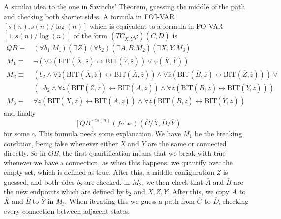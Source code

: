 A similar idea to the one in Savitchs' Theorem, guessing the middle of the path and checking both shorter sides.
A formula in FO$\exists$-VAR$[s(n), s(n)/\log(n)]$ which is equivalent to a formula in FO-VAR$[1, s(n)/\log(n)]$ of the form $\left( TC_{\overline{X}, \overline{Y}}\varphi \right)(\overline{C}, \overline{D})$ is
\[
\begin{aligned}
    QB \equiv~& (\forall b_{1}.M_{1})(\exists\overline{Z}) (\forall b_{2})(\exists \overline{A}, \overline{B}.M_{2})(\exists\overline{X}, \overline{Y}.M_{3}) \\
    M_{1} \equiv~& \neg(\forall \overline{z} (\text{BIT}(\overline{X}, \overline{z}) \leftrightarrow \text{BIT}(\overline{Y}, \overline{z})) \lor \varphi(\overline{X}, \overline{Y})) \\
    M_{2} \equiv~&(b_{2} \land \forall \overline{z} (\text{BIT}(\overline{X}, \overline{z}) \leftrightarrow \text{BIT}(\overline{A}, \overline{z}))\land \forall \overline{z} (\text{BIT}(\overline{B}, \overline{z}) \leftrightarrow \text{BIT}(\overline{Z}, \overline{z}))) \lor \\
    &(\neg b_{2} \land \forall \overline{z} (\text{BIT}(\overline{Z}, \overline{z}) \leftrightarrow \text{BIT}(\overline{A}, \overline{z}))\land \forall \overline{z} (\text{BIT}(\overline{B}, \overline{z}) \leftrightarrow \text{BIT}(\overline{Y}, \overline{z}))) \\
    M_{3} \equiv~&\forall \overline{z} (\text{BIT}(\overline{X}, \overline{z}) \leftrightarrow \text{BIT}(\overline{A}, \overline{z}))\land \forall \overline{z} (\text{BIT}(\overline{B}, \overline{z}) \leftrightarrow \text{BIT}(\overline{Y}, \overline{z}))
\end{aligned}
\]
and finally
\[
    [QB]^{cs(n)}(false)(\overline{C} / \overline{X}, \overline{D} / \overline{Y})
\]
for some $c$.
This formula needs some explanation.
We have $M_1$ be the breaking condition, being false whenever either $\overline{X}$ and $\overline{Y}$ are the same or connected directly.
So in $QB$, the first quantification means that we break with true whenever we have a connection, as when this happens, we quantify over the empty set, which is defined as true.
After this, a middle configuration $\overline{Z}$ is guessed, and both sides $b_2$ are checked.
In $M_2$, we then check that $\overline{A}$ and $\overline{B}$ are the new endpoints which are defined by $b_2$ and $\overline{X}, \overline{Z}, \overline{Y}$.
After this, we copy $\overline{A}$ to $\overline{X}$ and $\overline{B}$ to $\overline{Y}$ in $M_3$.
When iterating this we guess a path from $\overline{C}$ to $\overline{D}$, checking every connection between adjacent states.

